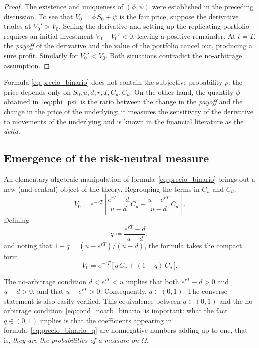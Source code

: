 \documentclass[11pt,a4paper,oneside]{report}
\theoremstyle{plain}
\theoremstyle{definition}
\theoremstyle{remark}
\newcommand{\1}{\mathbf{1}}
\newcommand{\eqdef}{\coloneqq}
\begin{document}
\begin{proof}
The existence and uniqueness of $(\phi, \psi)$ were established in the
preceding discussion. To see that $V_0 = \phi\, S_0 + \psi$ is the
fair price, suppose the derivative trades at $V_0' > V_0$. Selling the
derivative and setting up the replicating portfolio requires an
initial investment $V_0 - V_0' < 0$, leaving a positive remainder. At
$t = T$, the \emph{payoff} of the derivative and the value of the
portfolio cancel out, producing a sure profit. Similarly for
$V_0' < V_0$. Both situations contradict the no-arbitrage assumption.
\end{proof}

Formula \eqref{eq:precio_binario} does
not contain the subjective probability $p$: the price depends only on
$S_0, u, d, r, T, C_u, C_d$. On the other hand, the quantity $\phi$
obtained in~\eqref{eq:phi_psi} is the ratio between the change in the
\emph{payoff} and the change in the price of the underlying: it
measures the sensitivity of the derivative to movements of the
underlying and is known in the financial literature as the
\emph{delta}.

\subsection{Emergence of the risk-neutral measure}
\label{subsec:medida_riesgo}

An elementary algebraic manipulation of formula~\eqref{eq:precio_binario}
brings out a new (and central) object of the
theory. Regrouping the terms in $C_u$ and $C_d$,
\begin{equation*}
  V_0 = e^{-rT}\!\left[\frac{e^{rT} - d}{u - d}\, C_u
                       + \frac{u - e^{rT}}{u - d}\, C_d\right].
\end{equation*}
Defining
\begin{equation}\label{eq:def_q}
  q \eqdef \frac{e^{rT} - d}{u - d},
\end{equation}
and noting that $1 - q = (u - e^{rT})/(u - d)$, the formula takes the
compact form
\begin{equation}\label{eq:precio_binario_q}
  V_0 = e^{-rT}\,\bigl[\,q\, C_u + (1 - q)\, C_d\,\bigr].
\end{equation}

The no-arbitrage
condition $d < e^{rT} < u$ implies that both $e^{rT} - d > 0$ and
$u - d > 0$, and that $u - e^{rT} > 0$. Consequently, $q \in (0, 1)$.
The converse statement is also easily verified. This equivalence
between $q \in (0,1)$ and the no-arbitrage
condition~\eqref{eq:cond_noarb_binario} is important: what the fact
$q \in (0,1)$ implies is that the coefficients appearing in
formula~\eqref{eq:precio_binario_q} are nonnegative numbers adding up
to one, that is, \emph{they are the probabilities of a measure on
$\Omega$}.
\end{document}
